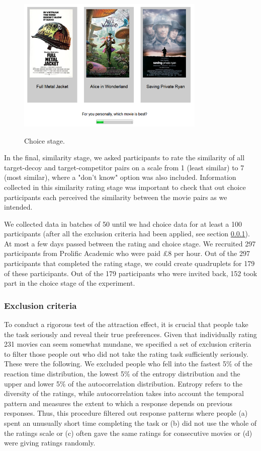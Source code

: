 \documentclass[12pt, a4paper]{article}
\begin{document}
\begin{figure}[htb!]
\centering
\captionsetup{justification=centering}
\caption{Choice stage.}
\includegraphics[width=0.8\textwidth]{rsz_exp1_choicestage.png}
\label{fig:exp1_screenshot}
\end{figure}

In the final, similarity stage, we asked participants to rate the similarity of all target-decoy and target-competitor pairs on a scale from 1 (least similar) to 7 (most similar), where a "don't know" option was also included. Information collected in this similarity rating stage was important to check that out choice participants each perceived the similarity between the movie pairs as we intended. 

We collected data in batches of 50 until we had choice data for at least a 100 participants (after all the exclusion criteria had been applied, see section \ref{exclusion_ref}). At most a few days passed between the rating and choice stage. We recruited 297 participants from Prolific Academic who were paid £8 per hour. Out of the 297 participants that completed the rating stage, we could create quadruplets for 179 of these participants. Out of the 179 participants who were invited back, 152 took part in the choice stage of the experiment.

\subsubsection{Exclusion criteria} \label{exclusion_ref}

To conduct a rigorous test of the attraction effect, it is crucial that people take the task seriously and reveal their true preferences. Given that individually rating 231 movies can seem somewhat mundane, we specified a set of exclusion criteria to filter those people out who did not take the rating task sufficiently seriously. These were the following. We excluded people who fell into the fastest 5\% of the reaction time distribution, the lowest 5\% of the entropy distribution and the upper and lower 5\% of the autocorrelation distribution. Entropy refers to the diversity of the ratings, while autocorrelation takes into account the temporal pattern and measures the extent to which a response depends on previous responses. Thus, this procedure filtered out response patterns where people (a) spent an unusually short time completing the task or (b) did not use the whole of the ratings scale or (c) often gave the same ratings for consecutive movies or (d) were giving ratings randomly.
\end{document}
